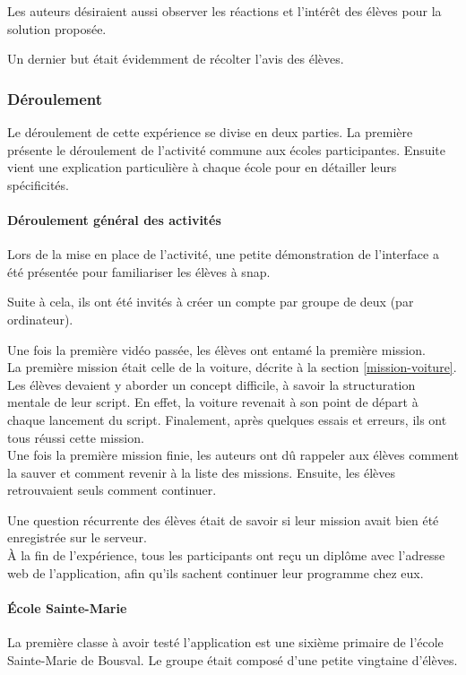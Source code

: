 Les auteurs désiraient aussi observer les réactions et l'intérêt des élèves pour la solution proposée.

Un dernier but était évidemment de récolter l'avis des élèves.

\subsubsection{Déroulement}
Le déroulement de cette expérience se divise en deux parties. La première présente le déroulement de l'activité commune aux écoles participantes. Ensuite vient une explication particulière à chaque école pour en détailler leurs spécificités.
\paragraph{Déroulement général des activités}
Lors de la mise en place de l'activité, une petite démonstration de l'interface a été présentée pour familiariser les élèves à \gls{snap}.

Suite à cela, ils ont été invités à créer un compte par groupe de deux (par ordinateur).

Une fois la première vidéo passée, les élèves ont entamé la première \gls{mission}.\\

La première \gls{mission} était celle de la voiture, décrite à la section \ref{mission-voiture}. Les élèves devaient y aborder un concept difficile, à savoir la structuration mentale de leur \gls{script}. En effet, la voiture revenait à son point de départ à chaque lancement du \gls{script}. Finalement, après quelques essais et erreurs, ils ont tous réussi cette \gls{mission}.\\

Une fois la première \gls{mission} finie, les auteurs ont dû rappeler aux élèves comment la sauver et comment revenir à la liste des \glspl{mission}. Ensuite, les élèves retrouvaient seuls comment continuer.

Une question récurrente des élèves était de savoir si leur \gls{mission} avait bien été enregistrée sur le serveur.\\

À la fin de l'expérience, tous les participants ont reçu un diplôme avec l'adresse web de l'application, afin qu'ils sachent continuer leur programme chez eux.

\paragraph{École Sainte-Marie}
La première classe à avoir testé l'application est une sixième \gls{primaire} de l'école Sainte-Marie de Bousval. Le groupe était composé d'une petite vingtaine d'élèves.

